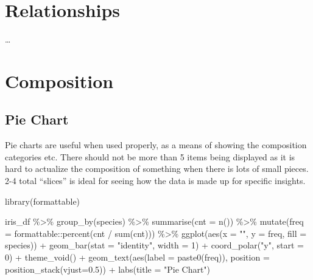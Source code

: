 \documentclass[
  letterpaper,
  DIV=11,
  numbers=noendperiod]{scrreprt}
\newenvironment{Shaded}{\begin{snugshade}}{\end{snugshade}}
\newcommand{\AttributeTok}[1]{\textcolor[rgb]{0.40,0.45,0.13}{#1}}
\newcommand{\DecValTok}[1]{\textcolor[rgb]{0.68,0.00,0.00}{#1}}
\newcommand{\FloatTok}[1]{\textcolor[rgb]{0.68,0.00,0.00}{#1}}
\newcommand{\FunctionTok}[1]{\textcolor[rgb]{0.28,0.35,0.67}{#1}}
\newcommand{\NormalTok}[1]{\textcolor[rgb]{0.00,0.23,0.31}{#1}}
\newcommand{\SpecialCharTok}[1]{\textcolor[rgb]{0.37,0.37,0.37}{#1}}
\newcommand{\StringTok}[1]{\textcolor[rgb]{0.13,0.47,0.30}{#1}}
\begin{document}
\hypertarget{relationships}{%
\section{\texorpdfstring{\textbf{Relationships}}{Relationships}}\label{relationships}}

\ldots{}

\hypertarget{composition}{%
\section{\texorpdfstring{\textbf{Composition}}{Composition}}\label{composition}}

\hypertarget{pie-chart}{%
\subsection{Pie Chart}\label{pie-chart}}

Pie charts are useful when used properly, as a means of showing the
composition categories etc. There should not be more than 5 items being
displayed as it is hard to actualize the composition of something when
there is lots of small pieces. 2-4 total ``slices'' is ideal for seeing
how the data is made up for specific insights.

\begin{Shaded}
\begin{Highlighting}[]
\FunctionTok{library}\NormalTok{(formattable)}

\NormalTok{iris\_df }\SpecialCharTok{\%\textgreater{}\%}
  \FunctionTok{group\_by}\NormalTok{(species) }\SpecialCharTok{\%\textgreater{}\%}
  \FunctionTok{summarise}\NormalTok{(}\AttributeTok{cnt =} \FunctionTok{n}\NormalTok{()) }\SpecialCharTok{\%\textgreater{}\%}
  \FunctionTok{mutate}\NormalTok{(}\AttributeTok{freq =}\NormalTok{ formattable}\SpecialCharTok{::}\FunctionTok{percent}\NormalTok{(cnt }\SpecialCharTok{/} \FunctionTok{sum}\NormalTok{(cnt))) }\SpecialCharTok{\%\textgreater{}\%} 
  \FunctionTok{ggplot}\NormalTok{(}\FunctionTok{aes}\NormalTok{(}\AttributeTok{x =} \StringTok{""}\NormalTok{, }\AttributeTok{y =}\NormalTok{ freq, }\AttributeTok{fill =}\NormalTok{ species)) }\SpecialCharTok{+}
  \FunctionTok{geom\_bar}\NormalTok{(}\AttributeTok{stat =} \StringTok{"identity"}\NormalTok{, }\AttributeTok{width =} \DecValTok{1}\NormalTok{) }\SpecialCharTok{+}
  \FunctionTok{coord\_polar}\NormalTok{(}\StringTok{"y"}\NormalTok{, }\AttributeTok{start =} \DecValTok{0}\NormalTok{) }\SpecialCharTok{+}
  \FunctionTok{theme\_void}\NormalTok{() }\SpecialCharTok{+}
  \FunctionTok{geom\_text}\NormalTok{(}\FunctionTok{aes}\NormalTok{(}\AttributeTok{label =} \FunctionTok{paste0}\NormalTok{(freq)), }\AttributeTok{position =} \FunctionTok{position\_stack}\NormalTok{(}\AttributeTok{vjust=}\FloatTok{0.5}\NormalTok{)) }\SpecialCharTok{+}
  \FunctionTok{labs}\NormalTok{(}\AttributeTok{title =} \StringTok{"Pie Chart"}\NormalTok{)}
\end{Highlighting}
\end{Shaded}
\end{document}
